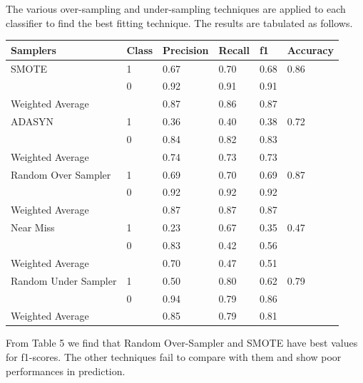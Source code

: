 \documentclass{article}
\begin{document}
\bigbreak
\bigbreak
\bigbreak

The various over-sampling and under-sampling techniques are applied to each classifier to find the best fitting technique. The results are tabulated as follows. 

\begin{center}
 \label{tab:title} 
\begin{tabular}{ |p{2cm}|p{1cm}|p{2cm}|p{1cm}|p{1cm}|p{2cm}| }
 \hline
 Samplers & Class & Precision & Recall & f1 & Accuracy\\
 \hline
 SMOTE  & 1  & 0.67 & 0.70 & 0.68 & 0.86 \\
        & 0  & 0.92 & 0.91 & 0.91 &  \\
\hline
 Weighted Average & & 0.87 & 0.86 & 0.87 &  \\
 \hline
 \hline
 ADASYN   & 1  & 0.36 & 0.40 & 0.38 & 0.72 \\
          & 0  & 0.84 & 0.82 & 0.83 & \\
\hline
 Weighted Average & & 0.74 & 0.73 & 0.73 & \\
 \hline
 \hline
 Random Over Sampler  & 1  & 0.69 & 0.70 & 0.69 & 0.87\\
               & 0  & 0.92 & 0.92 & 0.92 & \\
\hline
 Weighted Average & & 0.87 & 0.87 & 0.87 & \\
 \hline
 \hline
 Near Miss  & 1  & 0.23 & 0.67 & 0.35 & 0.47\\
               & 0  & 0.83 & 0.42 & 0.56 & \\
\hline
 Weighted Average & & 0.70 & 0.47 & 0.51 & \\
 \hline
 \hline
 Random Under Sampler  & 1  & 0.50 & 0.80 & 0.62 & 0.79\\
               & 0  & 0.94 & 0.79 & 0.86 & \\
\hline
 Weighted Average & & 0.85 & 0.79 & 0.81 & \\
 \hline
\end{tabular}

\end{center}

From Table 5 we find that Random Over-Sampler and SMOTE have best values for f1-scores. The other techniques fail to compare with them and show poor performances in prediction.
\end{document}
